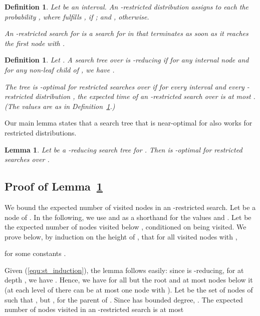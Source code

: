\documentclass[letterpaper,11pt]{article}
\newtheorem{lemma}[theorem]{Lemma}
\newtheorem{definition}[theorem]{Definition}
\begin{document}
\begin{definition}\label{def:rest}
  Let   be an interval.
  An \emph{-restricted distribution} 
   assigns to each 
  the probability , 
  where   fulfills , 
  if ; and , otherwise.  

  An \emph{-restricted search} for  
  is a search for  in  that terminates 
  as soon as it reaches the first node  with 
  .
\end{definition}

\begin{definition}\label{def:tree}
  Let .  A search tree 
   over  is \emph{-reducing} 
  if for any internal node  and 
  for any non-leaf child  of , we 
  have . 

  The tree  is \emph{-optimal 
  for restricted searches over } if 
  for every interval  
  and every -restricted distribution 
  , the expected time of an -restricted 
  search over  is at most . 
  (The values  are as in Definition~\ref{def:rest}.)
\end{definition}

Our main lemma states that a
search tree that is near-optimal for 
 also works for
restricted distributions. 

\begin{lemma}\label{lem:search-time} 
  Let  be a -reducing search tree 
  for . Then  is -optimal 
  for restricted searches over .
\end{lemma}

\subsection{Proof of Lemma~\ref{lem:search-time}}\label{sec:restricted}

We bound the expected number 
of visited nodes in an 
-restricted search. 
Let  be a node of .  
In the following, we use  
and  as 
a shorthand for the values 
 and . 
Let  be the expected number 
of nodes visited below , conditioned
on  being visited.
We prove below, by induction 
on the height of , that for all
visited nodes  with , 

for some constants .  

Given (\ref{equ:st_induction}), 
the lemma follows easily:
since  is -reducing, 
for  at depth , we 
have . Hence, 
we have  for 
all but the root and at most 
 nodes below 
it (at each
level of  there can be at most 
one node with ).
Let  be the set of nodes  of  
such that , but
, for the parent  
of . Since  has bounded degree,
. The expected 
number  of nodes visited 
in an -restricted search is at most
\end{document}
